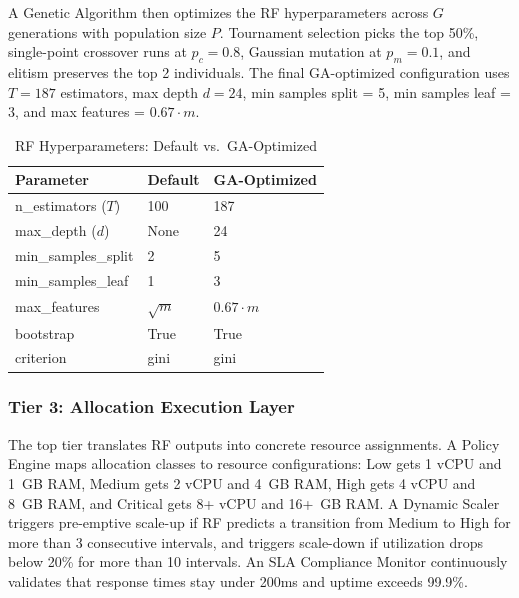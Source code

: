 \documentclass[conference]{IEEEtran}
\begin{document}
A Genetic Algorithm then optimizes the RF hyperparameters across $G$ generations with population size $P$. Tournament selection picks the top 50\%, single-point crossover runs at $p_c = 0.8$, Gaussian mutation at $p_m = 0.1$, and elitism preserves the top 2 individuals. The final GA-optimized configuration uses $T = 187$ estimators, max depth $d = 24$, min samples split = 5, min samples leaf = 3, and max features = $0.67 \cdot m$.

\begin{table}[htbp]
\caption{RF Hyperparameters: Default vs.\ GA-Optimized}
\begin{center}
\begin{tabular}{|p{2.8cm}|p{2.0cm}|p{2.0cm}|}
\hline
\textbf{Parameter} & \textbf{Default} & \textbf{GA-Optimized} \\
\hline
n\_estimators ($T$) & 100 & 187 \\
\hline
max\_depth ($d$) & None & 24 \\
\hline
min\_samples\_split & 2 & 5 \\
\hline
min\_samples\_leaf & 1 & 3 \\
\hline
max\_features & $\sqrt{m}$ & $0.67 \cdot m$ \\
\hline
bootstrap & True & True \\
\hline
criterion & gini & gini \\
\hline
\end{tabular}
\label{tab:hyperparams}
\end{center}
\end{table}

\subsubsection{Tier 3: Allocation Execution Layer}
The top tier translates RF outputs into concrete resource assignments. A Policy Engine maps allocation classes to resource configurations: Low gets 1 vCPU and 1~GB RAM, Medium gets 2 vCPU and 4~GB RAM, High gets 4 vCPU and 8~GB RAM, and Critical gets 8+ vCPU and 16+~GB RAM. A Dynamic Scaler triggers pre-emptive scale-up if RF predicts a transition from Medium to High for more than 3 consecutive intervals, and triggers scale-down if utilization drops below 20\% for more than 10 intervals. An SLA Compliance Monitor continuously validates that response times stay under 200ms and uptime exceeds 99.9\%.
\end{document}
